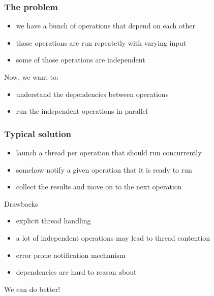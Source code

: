 \documentclass[11pt]{beamer}
\begin{document}
\begin{frame}[fragile]
\frametitle{The problem}

\begin{itemize}
\itemsep .5em
\item we have a bunch of operations that depend on each other
\item those operations are run repeatetly with varying input
\item some of those operations are independent
\end{itemize}

\bigskip
\bigskip

Now, we want to:
\bigskip
\begin{itemize}
\itemsep .5em
\item understand the dependencies between operations
\item run the independent operations in parallel
\end{itemize}

\end{frame}


\begin{frame}[fragile]
\frametitle{Typical solution}

\begin{itemize}
\itemsep .5em
\item launch a thread per operation that should run concurrently
\item somehow notify a given operation that it is ready to run
\item collect the results and move on to the next operation
\end{itemize}

\bigskip

Drawbacks
\begin{itemize}
\itemsep .5em
\item explicit thread handling
\item a lot of independent operations may lead to thread contention
\item error prone notification mechanism
\item dependencies are hard to reason about
\end{itemize}

\bigskip

We can do better!

\end{frame}
\end{document}
